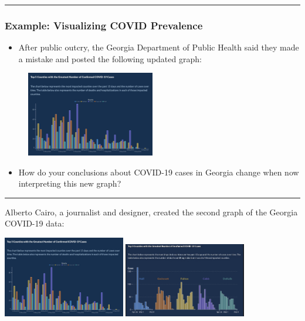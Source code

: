\documentclass[
  letterpaper,
  DIV=11,
  numbers=noendperiod]{scrartcl}
\providecommand{\tightlist}{%
  \setlength{\itemsep}{0pt}\setlength{\parskip}{0pt}}\usepackage{longtable,booktabs,array}
\begin{document}
\begin{center}\rule{0.5\linewidth}{0.5pt}\end{center}

\hypertarget{example-visualizing-covid-prevalence-2}{%
\subsubsection{Example: Visualizing COVID
Prevalence}\label{example-visualizing-covid-prevalence-2}}

\begin{itemize}
\tightlist
\item
  After public outcry, the Georgia Department of Public Health said they
  made a mistake and posted the following updated graph:
\end{itemize}

\begin{figure}

{\centering \includegraphics[width=0.5\textwidth,height=\textheight]{img/GAcovid2.jpg}

}

\end{figure}

\begin{itemize}
\tightlist
\item
  How do your conclusions about COVID-19 cases in Georgia change when
  now interpreting this new graph?
\end{itemize}

\begin{center}\rule{0.5\linewidth}{0.5pt}\end{center}

Alberto Cairo, a journalist and designer, created the second graph of
the Georgia COVID-19 data:

\includegraphics[width=0.4\textwidth,height=\textheight]{img/GAcovid2.jpg}
\includegraphics[width=0.4\textwidth,height=\textheight]{img/GAcovid_cairo.png}
\end{document}
